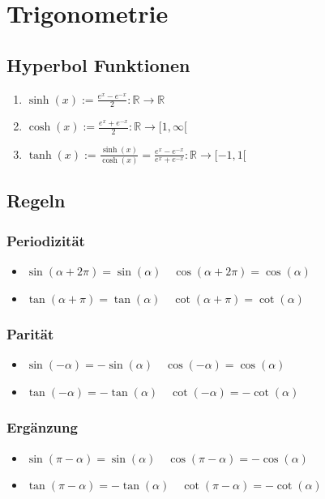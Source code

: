 \documentclass[a4paper,8pt]{extarticle}
\def\R{\mathbb{R}}
\begin{document}
\section{Trigonometrie} 
\subsection{Hyperbol Funktionen}
\begin{enumerate}
  \item $\sinh(x) := \frac{e^x - e^{-x}}{2} : \R \to \R$
  \item $\cosh(x) := \frac{e^x + e^{-x}}{2} : \R \to [1, \infty[$
  \item $\tanh(x) := \frac{\sinh(x)}{\cosh(x)} = \frac{e^x - e^{-x}}{e^x + e^{-x}} : \R \to [-1, 1[$
\end{enumerate}
\subsection{Regeln}
\subsubsection{Periodizität}
\begin{itemize}
 \item $\sin(\alpha + 2 \pi) = \sin(\alpha) \quad \cos(\alpha + 2 \pi) = \cos(\alpha)$
 \item $\tan(\alpha + \pi) = \tan(\alpha) \quad \cot(\alpha + \pi) = \cot(\alpha)$
\end{itemize}

\subsubsection{Parität}
\begin{itemize}
 \item $\sin(-\alpha) = - \sin(\alpha) \quad \cos(-\alpha) = \cos(\alpha)$
 \item $\tan(-\alpha) = - \tan(\alpha) \quad \cot(-\alpha) = - \cot(\alpha)$
\end{itemize}

\subsubsection{Ergänzung}
\begin{itemize}
 \item $\sin(\pi - \alpha) = \sin(\alpha) \quad \cos(\pi - \alpha) = - \cos(\alpha)$
 \item $\tan(\pi - \alpha) = -\tan(\alpha) \quad \cot(\pi - \alpha) = - \cot(\alpha)$
\end{itemize}
\end{document}
